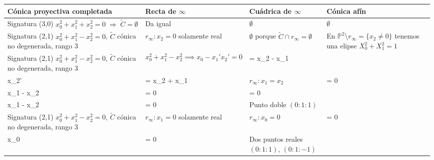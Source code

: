 \begin{table}[h!]
    \centering
    \renewcommand{\arraystretch}{1.4}
    \setlength{\tabcolsep}{6pt}
    \begin{tabular}{|p{3.6cm}|p{3.6cm}|p{3.6cm}|p{3.6cm}|}
    \hline
    \textbf{Cónica proyectiva completada} & 
    \textbf{Recta de $\infty$} &
    \textbf{Cuádrica de $\infty$} &
    \textbf{Cónica afín} \\ \hline
    
    Signatura (3,0) $x_0^2+x_1^2+x_2^2=0 \;\Rightarrow\; \tilde{C} = \emptyset$
    &
    Da igual
    &
    $\emptyset$
    &
    $\emptyset$
    \\ \hline
    
    Signatura (2,1) $x_0^2+x_1^2 - x_2^2=0$, \quad $\tilde{C}$ cónica no degenerada, rango 3
    &
    $r_\infty : x_2 = 0$ solamente real
    &
    $\emptyset$ porque $\tilde{C} \cap r_\infty = \emptyset$
    &
    En $\mathbb{P}^2 \setminus r_\infty = \{x_2 \neq 0\}$ tenemos una elipse $X_0^2 + X_1^2 = 1$
    \\ \hline
    
    Signatura (2,1) $x_0^2+x_1^2 - x_2^2=0$, \quad $\tilde{C}$ cónica no degenerada, rango 3
    &
    \[
    x_0^2 + x_1^2 - x_2^2 
    \implies 
    x_0 - x_1' x_2' = 0
    \]
    \[
    \begin{aligned}
    x_1' &= x_2 - x_1 \\
    x_2' &= x_2 + x_1
    \end{aligned}
    \]
    &
    $r_\infty : x_1 = x_2$
    \[
    \begin{aligned}
    x_0 + x_1^2 - x_2^2 &= 0 \\
    x_1 - x_2 &= 0
    \end{aligned}
    \Rightarrow
    \begin{aligned}
    x_0 &= 0 \\
    x_1 - x_2 &= 0
    \end{aligned}
    \]
    Luego $r_\infty : x_0'=0$
    &
    Punto doble $(0:1:1)$
    \\ \hline
    
    Signatura (2,1) $x_0^2+x_1^2 - x_2^2=0$, \quad $\tilde{C}$ cónica no degenerada, rango 3
    &
    $r_\infty : x_1=0$ solamente real
    &
    $r_\infty : x_0=0$
    \[
    \begin{aligned}
    x_0^2 + x_1^2 - x_2^2 &= 0 \\
    x_0 &= 0
    \end{aligned}
    \]
    &
    Dos puntos reales $(0:1:1)$, $(0:1:-1)$
    \\ \hline
    

\end{tabular}
\end{table}
